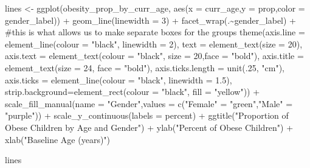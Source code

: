 \documentclass[
  letterpaper,
  DIV=11,
  numbers=noendperiod]{scrreprt}
\newenvironment{Shaded}{\begin{snugshade}}{\end{snugshade}}
\newcommand{\AttributeTok}[1]{\textcolor[rgb]{0.40,0.45,0.13}{#1}}
\newcommand{\CommentTok}[1]{\textcolor[rgb]{0.37,0.37,0.37}{#1}}
\newcommand{\DecValTok}[1]{\textcolor[rgb]{0.68,0.00,0.00}{#1}}
\newcommand{\FloatTok}[1]{\textcolor[rgb]{0.68,0.00,0.00}{#1}}
\newcommand{\FunctionTok}[1]{\textcolor[rgb]{0.28,0.35,0.67}{#1}}
\newcommand{\NormalTok}[1]{\textcolor[rgb]{0.00,0.23,0.31}{#1}}
\newcommand{\OtherTok}[1]{\textcolor[rgb]{0.00,0.23,0.31}{#1}}
\newcommand{\SpecialCharTok}[1]{\textcolor[rgb]{0.37,0.37,0.37}{#1}}
\newcommand{\StringTok}[1]{\textcolor[rgb]{0.13,0.47,0.30}{#1}}
\begin{document}
\begin{Shaded}
\begin{Highlighting}[]
\NormalTok{lines }\OtherTok{\textless{}{-}} \FunctionTok{ggplot}\NormalTok{(obesity\_prop\_by\_curr\_age,}
                \FunctionTok{aes}\NormalTok{(}\AttributeTok{x =}\NormalTok{ curr\_age,}\AttributeTok{y =}\NormalTok{ prop,}\AttributeTok{color =}\NormalTok{ gender\_label)) }\SpecialCharTok{+} 
  \FunctionTok{geom\_line}\NormalTok{(}\AttributeTok{linewidth =} \DecValTok{3}\NormalTok{) }\SpecialCharTok{+}
  \FunctionTok{facet\_wrap}\NormalTok{(.}\SpecialCharTok{\textasciitilde{}}\NormalTok{gender\_label) }\SpecialCharTok{+} \CommentTok{\#this is what allows us to make separate boxes for the groups}
  \FunctionTok{theme}\NormalTok{(}\AttributeTok{axis.line =} \FunctionTok{element\_line}\NormalTok{(}\AttributeTok{colour =} \StringTok{"black"}\NormalTok{, }\AttributeTok{linewidth =} \DecValTok{2}\NormalTok{),}
        \AttributeTok{text =} \FunctionTok{element\_text}\NormalTok{(}\AttributeTok{size =} \DecValTok{20}\NormalTok{),}
        \AttributeTok{axis.text =} \FunctionTok{element\_text}\NormalTok{(}\AttributeTok{colour =} \StringTok{"black"}\NormalTok{, }\AttributeTok{size =} \DecValTok{20}\NormalTok{,}\AttributeTok{face =} \StringTok{"bold"}\NormalTok{),}
        \AttributeTok{axis.title =} \FunctionTok{element\_text}\NormalTok{(}\AttributeTok{size =} \DecValTok{24}\NormalTok{, }\AttributeTok{face =} \StringTok{"bold"}\NormalTok{),}
        \AttributeTok{axis.ticks.length =} \FunctionTok{unit}\NormalTok{(.}\DecValTok{25}\NormalTok{, }\StringTok{"cm"}\NormalTok{),}
        \AttributeTok{axis.ticks =} \FunctionTok{element\_line}\NormalTok{(}\AttributeTok{colour =} \StringTok{"black"}\NormalTok{, }\AttributeTok{linewidth =} \FloatTok{1.5}\NormalTok{),}
        \AttributeTok{strip.background=}\FunctionTok{element\_rect}\NormalTok{(}\AttributeTok{colour =} \StringTok{"black"}\NormalTok{, }\AttributeTok{fill =} \StringTok{"yellow"}\NormalTok{)) }\SpecialCharTok{+}
  \FunctionTok{scale\_fill\_manual}\NormalTok{(}\AttributeTok{name =} \StringTok{"Gender"}\NormalTok{,}\AttributeTok{values =} \FunctionTok{c}\NormalTok{(}\StringTok{"Female"} \OtherTok{=} \StringTok{"green"}\NormalTok{,}\StringTok{"Male"} \OtherTok{=} \StringTok{"purple"}\NormalTok{)) }\SpecialCharTok{+}
  \FunctionTok{scale\_y\_continuous}\NormalTok{(}\AttributeTok{labels =}\NormalTok{ percent) }\SpecialCharTok{+}
  \FunctionTok{ggtitle}\NormalTok{(}\StringTok{"Proportion of Obese Children by Age and Gender"}\NormalTok{) }\SpecialCharTok{+}
  \FunctionTok{ylab}\NormalTok{(}\StringTok{"Percent of Obese Children"}\NormalTok{) }\SpecialCharTok{+}
  \FunctionTok{xlab}\NormalTok{(}\StringTok{"Baseline Age (years)"}\NormalTok{)}

\NormalTok{lines}
\end{Highlighting}
\end{Shaded}
\end{document}
